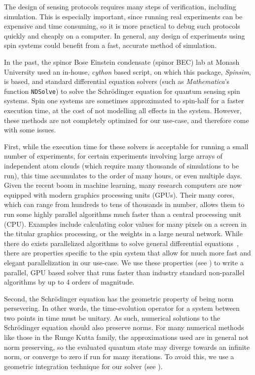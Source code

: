 \documentclass{jors}
\begin{document}
	The design of sensing protocols requires many steps of verification, including simulation.
	This is especially important, since running real experiments can be expensive and time consuming, so it is more practical to debug such protocols quickly and cheaply on a computer.
	In general, any design of experiments using spin systems could benefit from a fast, accurate method of simulation.

	In the past, the spinor Bose Einstein condensate (spinor BEC) lab at Monash University used an in-house, \emph{cython} based script, on which this package, \emph{Spinsim}, is based, and standard differential equation solvers (such as \emph{Mathematica}'s~\cite{wolfram_research_inc_mathematica_2020} function \texttt{NDSolve}) to solve the Schr\"odinger equation for quantum sensing spin systems.
	Spin one systems are sometimes approximated to spin-half for a faster execution time, at the cost of not modelling all effects in the system.
	However, these methods are not completely optimized for our use-case, and therefore come with some issues.

	First, while the execution time for these solvers is acceptable for running a small number of experiments, for certain experiments involving large arrays of independent atom clouds (which require many thousands of simulations to be run), this time accumulates to the order of many hours, or even multiple days.
	Given the recent boom in machine learning, many research computers are now equipped with modern graphics processing units (GPUs).
	Their many cores, which can range from hundreds to tens of thousands in number, allows them to run some highly parallel algorithms much faster than a central processing unit (CPU).
	Examples include calculating color values for many pixels on a screen in the titular graphics processing, or the weights in a large neural network.
	While there do exists parallelized algorithms to solve general differential equations~\cite{lions_resolution_2001}, there are properties specific to the spin system that allow for much more fast and elegant parallelization in our use-case.
	We use these properties (see \emph{}) to write a parallel, GPU based solver that runs faster than industry standard non-parallel algorithms by up to 4 orders of magnitude.

	Second, the Schr\"odinger equation has the geometric property of being norm persevering.
	In other words, the time-evolution operator for a system between two points in time must be unitary.
	As such, numerical solutions to the Schr\"odinger equation should also preserve norms.
	For many numerical methods like those in the Runge Kutta family, the approximations used are in general not norm preserving, so the evaluated quantum state may diverge towards an infinite norm, or converge to zero if run for many iterations.
	To avoid this, we use a geometric integration technique for our solver (see \emph{}).
\end{document}
